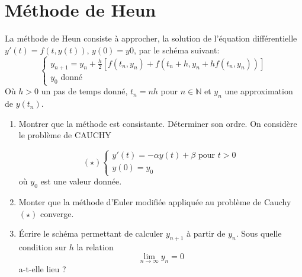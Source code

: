 \documentclass[a4paper]{article}
\begin{document}

\section{Méthode de Heun}
La méthode de Heun consiste à approcher, la solution de l'équation différentielle $y'(t) = f (t, y(t))$,  $y(0) = y0$, par le schéma suivant:
\[\left\{\begin{array}{l}
y_{n+1}=y_n+\frac h2\left[f(t_n,y_n)+f(t_n+h,y_n+hf(t_n,y_n))\right]\\
y_0 \mbox{ donné}
\end{array}\right.
\]
Où $h > 0$ un pas de temps donné, $t_n = nh$ pour $n \in\mathbb{N}$  et $y_n$ une approximation de $y(t_n)$.

\begin{enumerate}
\item Montrer que la méthode est consistante. Déterminer son ordre. On considère le problème de CAUCHY

\[(\star)\left\{\begin{array}{l}
y'(t)=-\alpha y(t)+\beta \mbox{ pour }t>0\\
y(0)=y_0
\end{array}\right.
\]
où $y_0$ est une valeur donnée.

\item Monter que la méthode d'Euler modifiée appliquée au problème de Cauchy $(\star)$ converge.
\item Écrire le schéma permettant de calculer $y_{n+1}$ à partir de $y_n$. Sous
quelle condition sur $h$ la relation 
\[\lim_{n\to\infty}y_n=0\]
 a-t-elle lieu ?
\end{enumerate}

\end{document}
